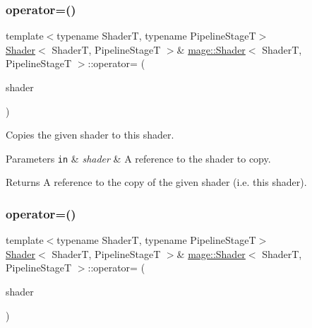 \subsubsection{\texorpdfstring{operator=()}{operator=()}\hspace{0.1cm}{\footnotesize\ttfamily [1/2]}}
{\footnotesize\ttfamily template$<$typename ShaderT, typename Pipeline\+StageT$>$ \\
\hyperlink{classmage_1_1_shader}{Shader}$<$ ShaderT, Pipeline\+StageT $>$\& \hyperlink{classmage_1_1_shader}{mage\+::\+Shader}$<$ ShaderT, Pipeline\+StageT $>$\+::operator= (\begin{DoxyParamCaption}\item[{const \hyperlink{classmage_1_1_shader}{Shader}$<$ ShaderT, Pipeline\+StageT $>$ \&}]{shader }\end{DoxyParamCaption})\hspace{0.3cm}{\ttfamily [delete]}}

Copies the given shader to this shader.


\begin{DoxyParams}[1]{Parameters}
\mbox{\tt in}  & {\em shader} & A reference to the shader to copy. \\
\hline
\end{DoxyParams}
\begin{DoxyReturn}{Returns}
A reference to the copy of the given shader (i.\+e. this shader). 
\end{DoxyReturn}
\hypertarget{classmage_1_1_shader_a2fa066425e397523b3ce181e5dc46c9d}{}\label{classmage_1_1_shader_a2fa066425e397523b3ce181e5dc46c9d} 
\subsubsection{\texorpdfstring{operator=()}{operator=()}\hspace{0.1cm}{\footnotesize\ttfamily [2/2]}}
{\footnotesize\ttfamily template$<$typename ShaderT, typename Pipeline\+StageT$>$ \\
\hyperlink{classmage_1_1_shader}{Shader}$<$ ShaderT, Pipeline\+StageT $>$\& \hyperlink{classmage_1_1_shader}{mage\+::\+Shader}$<$ ShaderT, Pipeline\+StageT $>$\+::operator= (\begin{DoxyParamCaption}\item[{\hyperlink{classmage_1_1_shader}{Shader}$<$ ShaderT, Pipeline\+StageT $>$ \&\&}]{shader }\end{DoxyParamCaption})\hspace{0.3cm}{\ttfamily [delete]}}

